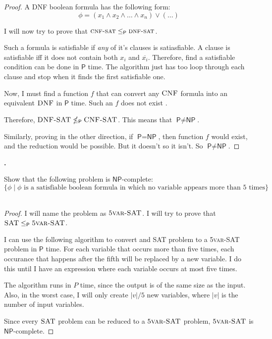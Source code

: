 \documentclass[letterpaper,11pt]{article}
\newcommand{\cc}[1]{\ensuremath{\textsf{#1}}\xspace}
\renewcommand{\P}{\cc{P}}
\newcommand{\NP}{\cc{NP}}
\newcommand{\karp}{\le_{\textsf{P}}}
\newcommand{\notkarp}{\nleq_{\textsf{P}}}
\newcounter{problem}
\newenvironment{problem}%
{%
	\stepcounter{problem}%
	\textbf{\theproblem.}
	\large
}{\\}%
\begin{document}
\begin{proof}
A DNF boolean formula has the following form:
\[
\phi = ( x_{1} \wedge x_{2} \wedge \ldots \wedge x_{n} ) \vee ( \ldots )
\]

I will now try to prove that $\textsc{cnf-sat} \karp \textsc{dnf-sat}$.

Such a formula is satisfiable if \textit{any} of it's clauses is satiasfiable.
A clause is satisfiable iff it does not contain both $x_{i}$ and $\overline{x_{i}}$.
Therefore, find a satisfiable condition can be done in \P{} time.
The algorithm just has too loop through each clause and stop when it finds the first satisfiable one.

Now, I must find a function $f$ that can convert any $\textsc{CNF}$ formula into an equivalent $\textsc{DNF}$ in \P{} time. 
Such an $f$ does not exist \cite{dnf}.

Therefore, $\textsc{DNF-SAT} \notkarp \textsc{CNF-SAT}$.
This means that $\P \neq \NP$.

Similarly, proving in the other direction, if $\P = \NP$, then function $f$ would exist, and the reduction would be possible.
But it doesn't so it isn't.
So $\P \neq \NP$.

\end{proof}


\begin{problem}
Show that the following problem is \NP-complete:
\[
    \{ \phi \mid \phi \mbox{ is a satisfiable boolean formula in which no variable appears more than 5 times}\}
\]
\end{problem}

\begin{proof}
I will name the problem as $\textsc{5var-SAT}$.
I will try to prove that $\textsc{SAT} \karp \textsc{5var-SAT}$.

I can use the following algorithm to convert and \textsc{SAT} problem to a \textsc{5var-SAT} problem in $\P$ time.
For each variable that occurs more than five times, each occurance that happens after the fifth will be replaced by a new variable.
I do this until I have an expression where each variable occurs at most five times.

The algorithm runs in $P$ time, since the output is of the same size as the input.
Also, in the worst case, I will only create $|v| / 5$ new variables, where $|v|$ is the number of input variables.

Since every $\textsc{SAT}$ problem can be reduced to a $\textsc{5var-SAT}$ problem, $\textsc{5var-SAT}$ is $\NP$-complete.
\end{proof}
\end{document}
